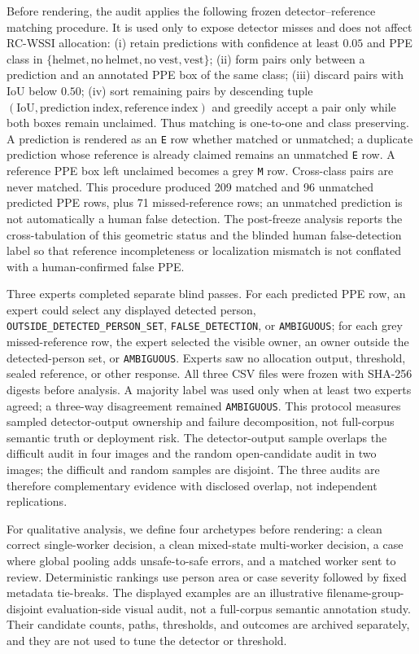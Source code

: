 \documentclass[iicol,pdflatex,sn-mathphys-num]{sn-jnl}
\begin{document}
Before rendering, the audit applies the following frozen detector--reference matching procedure. It is used only to expose detector misses and does not affect RC-WSSI allocation: (i) retain predictions with confidence at least $0.05$ and PPE class in $\{\mathrm{helmet},\mathrm{no\ helmet},\mathrm{no\ vest},\mathrm{vest}\}$; (ii) form pairs only between a prediction and an annotated PPE box of the same class; (iii) discard pairs with IoU below $0.50$; (iv) sort remaining pairs by descending tuple $(\mathrm{IoU},\mathrm{prediction\ index},\mathrm{reference\ index})$ and greedily accept a pair only while both boxes remain unclaimed. Thus matching is one-to-one and class preserving. A prediction is rendered as an \texttt{E} row whether matched or unmatched; a duplicate prediction whose reference is already claimed remains an unmatched \texttt{E} row. A reference PPE box left unclaimed becomes a grey \texttt{M} row. Cross-class pairs are never matched. This procedure produced 209 matched and 96 unmatched predicted PPE rows, plus 71 missed-reference rows; an unmatched prediction is not automatically a human false detection. The post-freeze analysis reports the cross-tabulation of this geometric status and the blinded human false-detection label so that reference incompleteness or localization mismatch is not conflated with a human-confirmed false PPE.

Three experts completed separate blind passes. For each predicted PPE row, an expert could select any displayed detected person, \texttt{OUTSIDE\_DETECTED\_PERSON\_SET}, \texttt{FALSE\_DETECTION}, or \texttt{AMBIGUOUS}; for each grey missed-reference row, the expert selected the visible owner, an owner outside the detected-person set, or \texttt{AMBIGUOUS}. Experts saw no allocation output, threshold, sealed reference, or other response. All three CSV files were frozen with SHA-256 digests before analysis. A majority label was used only when at least two experts agreed; a three-way disagreement remained \texttt{AMBIGUOUS}. This protocol measures sampled detector-output ownership and failure decomposition, not full-corpus semantic truth or deployment risk. The detector-output sample overlaps the difficult audit in four images and the random open-candidate audit in two images; the difficult and random samples are disjoint. The three audits are therefore complementary evidence with disclosed overlap, not independent replications.

For qualitative analysis, we define four archetypes before rendering: a clean correct single-worker decision, a clean mixed-state multi-worker decision, a case where global pooling adds unsafe-to-safe errors, and a matched worker sent to review. Deterministic rankings use person area or case severity followed by fixed metadata tie-breaks. The displayed examples are an illustrative filename-group-disjoint evaluation-side visual audit, not a full-corpus semantic annotation study. Their candidate counts, paths, thresholds, and outcomes are archived separately, and they are not used to tune the detector or threshold.
\end{document}
